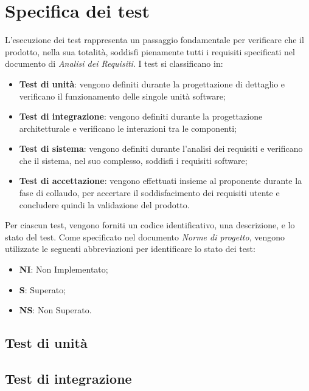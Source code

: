 \section{Specifica dei test}
L'esecuzione dei test rappresenta un passaggio fondamentale per verificare che 
il prodotto, nella sua totalità, soddisfi pienamente tutti i requisiti specificati
nel documento di \textit{Analisi dei Requisiti}.
I test si classificano in:
\begin{itemize}
    \item \textbf{Test di unità}: vengono definiti durante la progettazione di
    dettaglio e verificano il funzionamento delle singole unità software;
    \item \textbf{Test di integrazione}: vengono definiti durante la progettazione
    architetturale e verificano le interazioni tra le componenti;
    \item \textbf{Test di sistema}: vengono definiti durante l'analisi dei requisiti
    e verificano che il sistema, nel suo complesso, soddisfi i requisiti software;
    \item \textbf{Test di accettazione}: vengono effettuati insieme al proponente 
    durante la fase di collaudo, per accertare il soddisfacimento dei requisiti utente
    e concludere quindi la validazione del prodotto.
\end{itemize}
Per ciascun test, vengono forniti un codice identificativo, una descrizione, e
lo stato del test. 
Come specificato nel documento \textit{Norme di progetto}, vengono utilizzate le seguenti 
abbreviazioni per identificare lo stato dei test:
\begin{itemize}
    \item \textbf{NI}: Non Implementato;
    \item \textbf{S}: Superato;
    \item \textbf{NS}: Non Superato.
\end{itemize}


\subsection{Test di unità}
\subsection{Test di integrazione}
